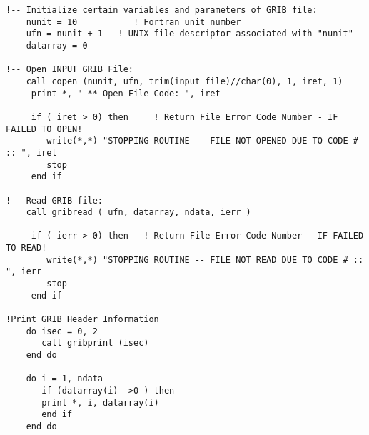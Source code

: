 \begin{verbatim}
!-- Initialize certain variables and parameters of GRIB file:
    nunit = 10           ! Fortran unit number
    ufn = nunit + 1   ! UNIX file descriptor associated with "nunit"
    datarray = 0

!-- Open INPUT GRIB File:
    call copen (nunit, ufn, trim(input_file)//char(0), 1, iret, 1)
     print *, " ** Open File Code: ", iret

     if ( iret > 0) then     ! Return File Error Code Number - IF FAILED TO OPEN!
        write(*,*) "STOPPING ROUTINE -- FILE NOT OPENED DUE TO CODE # :: ", iret
        stop
     end if

!-- Read GRIB file: 
    call gribread ( ufn, datarray, ndata, ierr )

     if ( ierr > 0) then   ! Return File Error Code Number - IF FAILED TO READ!
        write(*,*) "STOPPING ROUTINE -- FILE NOT READ DUE TO CODE # :: ", ierr
        stop
     end if

!Print GRIB Header Information
    do isec = 0, 2
       call gribprint (isec)
    end do

    do i = 1, ndata
       if (datarray(i)  >0 ) then
       print *, i, datarray(i)
       end if
    end do
\end{verbatim}
